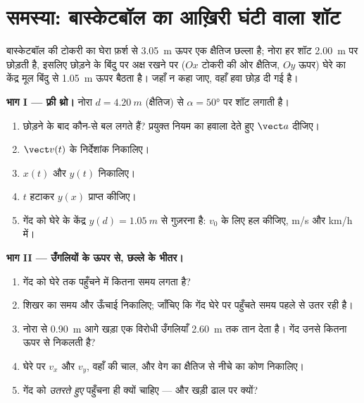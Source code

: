 \section{समस्या: बास्केटबॉल का आख़िरी घंटी वाला शॉट}

\begin{problem}
\label{pb:g12:projectile-motion:1}
बास्केटबॉल की टोकरी का घेरा फ़र्श से \qty{3.05}{m} ऊपर एक क्षैतिज छल्ला है; नोरा हर
शॉट \qty{2.00}{m} पर छोड़ती है, इसलिए छोड़ने के बिंदु पर अक्ष रखने पर ($Ox$
टोकरी की ओर क्षैतिज, $Oy$ ऊपर) घेरे का केंद्र मूल बिंदु से \qty{1.05}{m} ऊपर
बैठता है। जहाँ न कहा जाए, वहाँ हवा छोड़ दी गई है।

\medskip\noindent\textbf{भाग I --- फ़्री थ्रो।} नोरा $d = \qty{4.20}{m}$ (क्षैतिज) से
 $\alpha = \ang{50}$ पर शॉट लगाती है।
\begin{enumerate}
  \item छोड़ने के बाद कौन-से बल लगते हैं? प्रयुक्त नियम का हवाला देते
        हुए $\vect a$ दीजिए।
  \item $\vect v(t)$ के निर्देशांक निकालिए।
  \item $x(t)$ और $y(t)$ निकालिए।
  \item $t$ हटाकर  $y(x)$ प्राप्त कीजिए।
  \item गेंद को घेरे के केंद्र $y(d) = \qty{1.05}{m}$ से गुज़रना है: $v_0$ के लिए हल कीजिए,
        \unit{m/s} और \unit{km/h} में।
\end{enumerate}

\medskip\noindent\textbf{भाग II --- उँगलियों के ऊपर से, छल्ले के भीतर।}
\begin{enumerate}[resume]
  \item गेंद को घेरे तक पहुँचने में कितना समय लगता है?
  \item शिखर का समय और ऊँचाई निकालिए; जाँचिए कि गेंद घेरे पर पहुँचते समय पहले
        से उतर रही है।
  \item नोरा से \qty{0.90}{m} आगे खड़ा एक विरोधी उँगलियाँ \qty{2.60}{m} तक तान देता है।
        गेंद उनसे कितना ऊपर से निकलती है?
  \item घेरे पर $v_x$ और $v_y$, वहाँ की चाल, और वेग का क्षैतिज से नीचे
        का कोण निकालिए।
  \item गेंद को \emph{उतरते हुए} पहुँचना ही क्यों चाहिए --- और खड़ी ढाल पर
        क्यों?
\end{enumerate}


\end{problem}
